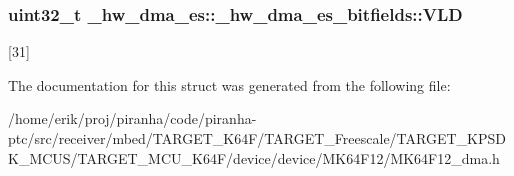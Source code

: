 \subsubsection[{\texorpdfstring{V\+LD}{VLD}}]{\setlength{\rightskip}{0pt plus 5cm}uint32\+\_\+t \+\_\+hw\+\_\+dma\+\_\+es\+::\+\_\+hw\+\_\+dma\+\_\+es\+\_\+bitfields\+::\+V\+LD}\hypertarget{struct__hw__dma__es_1_1__hw__dma__es__bitfields_a1c16f467e64bc9ce03c1f973fbfba89c}{}\label{struct__hw__dma__es_1_1__hw__dma__es__bitfields_a1c16f467e64bc9ce03c1f973fbfba89c}
\mbox{[}31\mbox{]} 

The documentation for this struct was generated from the following file\+:\begin{DoxyCompactItemize}
\item 
/home/erik/proj/piranha/code/piranha-\/ptc/src/receiver/mbed/\+T\+A\+R\+G\+E\+T\+\_\+\+K64\+F/\+T\+A\+R\+G\+E\+T\+\_\+\+Freescale/\+T\+A\+R\+G\+E\+T\+\_\+\+K\+P\+S\+D\+K\+\_\+\+M\+C\+U\+S/\+T\+A\+R\+G\+E\+T\+\_\+\+M\+C\+U\+\_\+\+K64\+F/device/device/\+M\+K64\+F12/M\+K64\+F12\+\_\+dma.\+h\end{DoxyCompactItemize}
